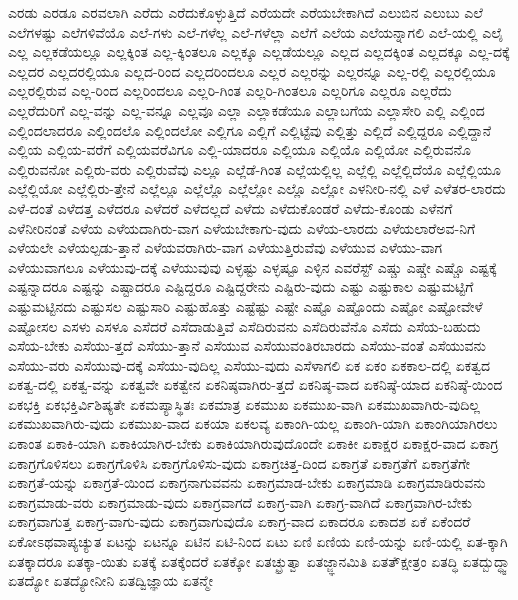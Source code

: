 {ಎರಡು
ಎರಡೂ
ಎರವಲಾಗಿ
ಎರೆದು
ಎರೆದುಕೊಳ್ಳುತ್ತಿದೆ
ಎರೆಯದೇ
ಎರೆಯಬೇಕಾಗಿದೆ
ಎಲುಬಿನ
ಎಲುಬು
ಎಲೆ
ಎಲೆಗಳಷ್ಟು
ಎಲೆಗಳಿವೆಯೊ
ಎಲೆ-ಗಳು
ಎಲೆ-ಗಳೆಲ್ಲ
ಎಲೆ-ಗಳೆಲ್ಲಾ
ಎಲೆಗೆ
ಎಲೆಯ
ಎಲೆಯನ್ನಾಗಲಿ
ಎಲೆ-ಯಲ್ಲಿ
ಎಲೈ
ಎಲ್ಲ
ಎಲ್ಲಕಡೆಯಲ್ಲೂ
ಎಲ್ಲಕ್ಕಿಂತ
ಎಲ್ಲ-ಕ್ಕಿಂತಲೂ
ಎಲ್ಲಕ್ಕೂ
ಎಲ್ಲಡೆಯಲ್ಲೂ
ಎಲ್ಲದ
ಎಲ್ಲದಕ್ಕಿಂತ
ಎಲ್ಲದಕ್ಕೂ
ಎಲ್ಲ-ದಕ್ಕೆ
ಎಲ್ಲದರ
ಎಲ್ಲದರಲ್ಲಿಯೂ
ಎಲ್ಲದ-ರಿಂದ
ಎಲ್ಲದರಿಂದಲೂ
ಎಲ್ಲರ
ಎಲ್ಲರನ್ನು
ಎಲ್ಲರನ್ನೂ
ಎಲ್ಲ-ರಲ್ಲಿ
ಎಲ್ಲರಲ್ಲಿಯೂ
ಎಲ್ಲರಲ್ಲಿರುವ
ಎಲ್ಲ-ರಿಂದ
ಎಲ್ಲರಿಂದಲೂ
ಎಲ್ಲರಿ-ಗಿಂತ
ಎಲ್ಲರಿ-ಗಿಂತಲೂ
ಎಲ್ಲರಿಗೂ
ಎಲ್ಲರೂ
ಎಲ್ಲರೆದು
ಎಲ್ಲರೆದುರಿಗೆ
ಎಲ್ಲ-ವನ್ನು
ಎಲ್ಲ-ವನ್ನೂ
ಎಲ್ಲವೂ
ಎಲ್ಲಾ
ಎಲ್ಲಾಕಡೆಯೂ
ಎಲ್ಲಾಬಗೆಯ
ಎಲ್ಲಾಸೇರಿ
ಎಲ್ಲಿ
ಎಲ್ಲಿಂದ
ಎಲ್ಲಿಂದಲಾದರೂ
ಎಲ್ಲಿಂದಲೊ
ಎಲ್ಲಿಂದಲೋ
ಎಲ್ಲಿಗೂ
ಎಲ್ಲಿಗೆ
ಎಲ್ಲಿಟ್ಟೆವು
ಎಲ್ಲಿತ್ತು
ಎಲ್ಲಿದೆ
ಎಲ್ಲಿದ್ದರೂ
ಎಲ್ಲಿದ್ದಾನೆ
ಎಲ್ಲಿಯ
ಎಲ್ಲಿಯ-ವರೆಗೆ
ಎಲ್ಲಿಯವರೆವಿಗೂ
ಎಲ್ಲಿ-ಯಾದರೂ
ಎಲ್ಲಿಯೂ
ಎಲ್ಲಿಯೊ
ಎಲ್ಲಿಯೋ
ಎಲ್ಲಿರುವನೊ
ಎಲ್ಲಿರುವನೋ
ಎಲ್ಲಿರು-ವರು
ಎಲ್ಲಿರುವೆವು
ಎಲ್ಲೂ
ಎಲ್ಲೆಡೆ-ಗಿಂತ
ಎಲ್ಲೆಯಲ್ಲಿಲ್ಲ
ಎಲ್ಲೆಲ್ಲಿ
ಎಲ್ಲೆಲ್ಲಿದೆಯೊ
ಎಲ್ಲೆಲ್ಲಿಯೂ
ಎಲ್ಲೆಲ್ಲಿಯೋ
ಎಲ್ಲೆಲ್ಲಿರು-ತ್ತೇನೆ
ಎಲ್ಲೆಲ್ಲೂ
ಎಲ್ಲೆಲ್ಲೊ
ಎಲ್ಲೆಲ್ಲೋ
ಎಲ್ಲೊ
ಎಲ್ಲೋ
ಎಳನೀರಿ-ನಲ್ಲಿ
ಎಳೆ
ಎಳೆತರ-ಲಾರದು
ಎಳೆ-ದಂತೆ
ಎಳೆದತ್ತ
ಎಳೆದರೂ
ಎಳೆದರೆ
ಎಳೆದಲ್ಲದೆ
ಎಳೆದು
ಎಳೆದುಕೊಂಡರೆ
ಎಳೆದು-ಕೊಂಡು
ಎಳೆನಗೆ
ಎಳೆನೀರಿನಂತೆ
ಎಳೆಯ
ಎಳೆಯದಾಗಿರು-ವಾಗ
ಎಳೆಯಬೇಕಾಗು-ವುದು
ಎಳೆಯ-ಲಾರದು
ಎಳೆಯಲಾರೆಅವ-ನಿಗೆ
ಎಳೆಯಲೇ
ಎಳೆಯಲ್ಪಡು-ತ್ತಾನೆ
ಎಳೆಯವರಾಗಿರು-ವಾಗ
ಎಳೆಯುತ್ತಿರುವೆವು
ಎಳೆಯುವ
ಎಳೆಯು-ವಾಗ
ಎಳೆಯುವಾಗಲೂ
ಎಳೆಯುವು-ದಕ್ಕೆ
ಎಳೆಯುವುವು
ಎಳ್ಳಷ್ಟು
ಎಳ್ಳಷ್ಟೂ
ಎಳ್ಳಿನ
ಎವರೆಸ್ಟ್
ಎಷ್ಚು
ಎಷ್ಚೇ
ಎಷ್ಚೊ
ಎಷ್ಟಕ್ಕೆ
ಎಷ್ಟನ್ನಾದರೂ
ಎಷ್ಟನ್ನು
ಎಷ್ಟಾದರೂ
ಎಷ್ಟಿದ್ದರೂ
ಎಷ್ಟಿದ್ದರೇನು
ಎಷ್ಟಿರು-ವುದು
ಎಷ್ಟು
ಎಷ್ಟುಕಾಲ
ಎಷ್ಟುಮಟ್ಟಿಗೆ
ಎಷ್ಟುಮಟ್ಟಿನದು
ಎಷ್ಟುಸಲ
ಎಷ್ಟುಸಾರಿ
ಎಷ್ಟುಹೊತ್ತು
ಎಷ್ಟೆಷ್ಟು
ಎಷ್ಟೇ
ಎಷ್ಟೊ
ಎಷ್ಟೊಂದು
ಎಷ್ಟೋ
ಎಷ್ಟೋವೇಳೆ
ಎಷ್ಟೋಸಲ
ಎಸಳು
ಎಸಳೂ
ಎಸೆದರೆ
ಎಸೆದಾಡುತ್ತಿವೆ
ಎಸೆದಿರುವನು
ಎಸೆದಿರುವೆನೊ
ಎಸೆದು
ಎಸೆಯ-ಬಹುದು
ಎಸೆಯ-ಬೇಕು
ಎಸೆಯು-ತ್ತದೆ
ಎಸೆಯು-ತ್ತಾನೆ
ಎಸೆಯುವ
ಎಸೆಯುವಂತಿರಬಾರದು
ಎಸೆಯು-ವಂತೆ
ಎಸೆಯುವನು
ಎಸೆಯು-ವರು
ಎಸೆಯುವು-ದಕ್ಕೆ
ಎಸೆಯು-ವುದಿಲ್ಲ
ಎಸೆಯು-ವುದು
ಎಸೆಳಾಗಲಿ
ಏಕ
ಏಕಂ
ಏಕಕಾಲ-ದಲ್ಲಿ
ಏಕತ್ವದ
ಏಕತ್ವ-ದಲ್ಲಿ
ಏಕತ್ವ-ವನ್ನು
ಏಕತ್ವವೇ
ಏಕತ್ವೇನ
ಏಕನಿಷ್ಠವಾಗಿರು-ತ್ತದೆ
ಏಕನಿಷ್ಠ-ವಾದ
ಏಕನಿಷ್ಠೆ-ಯಾದ
ಏಕನಿಷ್ಠೆ-ಯಿಂದ
ಏಕಭಕ್ತಿ
ಏಕಭಕ್ತಿರ್ವಿಶಿಷ್ಯತೇ
ಏಕಮಪ್ಯಾಸ್ಥಿತಃ
ಏಕಮಾತ್ರ
ಏಕಮುಖ
ಏಕಮುಖ-ವಾಗಿ
ಏಕಮುಖವಾಗಿರು-ವುದಿಲ್ಲ
ಏಕಮುಖವಾಗಿರು-ವುದು
ಏಕಮುಖ-ವಾದ
ಏಕಯಾ
ಏಕಲವ್ಯ
ಏಕಾಂಗಿ-ಯಲ್ಲ
ಏಕಾಂಗಿ-ಯಾಗಿ
ಏಕಾಂಗಿಯಾಗಿರಲು
ಏಕಾಂತ
ಏಕಾಕಿ-ಯಾಗಿ
ಏಕಾಕಿಯಾಗಿರ-ಬೇಕು
ಏಕಾಕಿಯಾಗಿರುವುದೊಂದೇ
ಏಕಾಕೀ
ಏಕಾಕ್ಷರ
ಏಕಾಕ್ಷರ-ವಾದ
ಏಕಾಗ್ರ
ಏಕಾಗ್ರಗೊಳಿಸಲು
ಏಕಾಗ್ರಗೊಳಿಸಿ
ಏಕಾಗ್ರಗೊಳಿಸು-ವುದು
ಏಕಾಗ್ರಚಿತ್ತ-ದಿಂದ
ಏಕಾಗ್ರತೆ
ಏಕಾಗ್ರತೆಗೆ
ಏಕಾಗ್ರತೆಗೇ
ಏಕಾಗ್ರತೆ-ಯನ್ನು
ಏಕಾಗ್ರತೆ-ಯಿಂದ
ಏಕಾಗ್ರನಾಗುವವನು
ಏಕಾಗ್ರಮಾಡ-ಬೇಕು
ಏಕಾಗ್ರಮಾಡಿ
ಏಕಾಗ್ರಮಾಡಿರುವನು
ಏಕಾಗ್ರಮಾಡು-ವರು
ಏಕಾಗ್ರಮಾಡು-ವುದು
ಏಕಾಗ್ರವಾಗದೆ
ಏಕಾಗ್ರ-ವಾಗಿ
ಏಕಾಗ್ರ-ವಾಗಿದೆ
ಏಕಾಗ್ರವಾಗಿರ-ಬೇಕು
ಏಕಾಗ್ರವಾಗುತ್ತ
ಏಕಾಗ್ರ-ವಾಗು-ವುದು
ಏಕಾಗ್ರವಾಗುವುದೊ
ಏಕಾಗ್ರ-ವಾದ
ಏಕಾದರೂ
ಏಕಾದಶ
ಏಕೆ
ಏಕೆಂದರೆ
ಏಕೋಽಥವಾಪ್ಯಚ್ಯುತ
ಏಟನ್ನು
ಏಟನ್ನೂ
ಏಟಿನ
ಏಟಿ-ನಿಂದ
ಏಟು
ಏಣಿ
ಏಣಿಯ
ಏಣಿ-ಯನ್ನು
ಏಣಿ-ಯಲ್ಲಿ
ಏತ-ಕ್ಕಾಗಿ
ಏತಕ್ಕಾದರೂ
ಏತಕ್ಕಾ-ಯಿತು
ಏತಕ್ಕೆ
ಏತಕ್ಕೆಂದರೆ
ಏತಕ್ಕೋ
ಏತಚ್ಛ್ರುತ್ವಾ
ಏತಜ್ಜ್ಞಾನಮಿತಿ
ಏತತ್ಕ್ಷೇತ್ರಂ
ಏತದ್ಧಿ
ಏತದ್ಬುದ್ಧ್ವಾ
ಏತದ್ಯೋ
ಏತದ್ಯೋನೀನಿ
ಏತದ್ವಿಜ್ಞಾಯ
ಏತನ್ಮೇ
}
